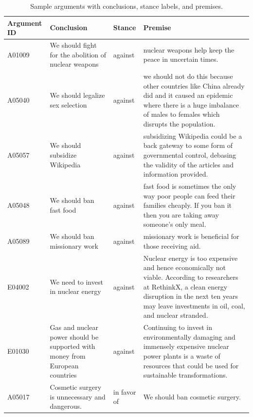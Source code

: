 \begin{table}[htbp]
\centering
\begingroup
\footnotesize
\renewcommand{\arraystretch}{1.12}%
\setlength{\tabcolsep}{4pt}%

\begin{tabularx}{\textwidth}{
  >{\raggedright\arraybackslash}p{1.8cm}   %
  >{\raggedright\arraybackslash}p{5.2cm}   %
  >{\raggedright\arraybackslash}p{1.6cm}   %
  >{\raggedright\arraybackslash}X          %
}
\toprule
\textbf{Argument ID} & \textbf{Conclusion} & \textbf{Stance} & \textbf{Premise} \\
\midrule
A01009 & We should fight for the abolition of nuclear weapons & against &
nuclear weapons help keep the peace in uncertain times. \\
A05040 & We should legalize sex selection & against &
we should not do this because other countries like China already did and it caused an epidemic where there is a huge imbalance of males to females which disrupts the population. \\
A05057 & We should subsidize Wikipedia & against &
subsidizing Wikipedia could be a back gateway to some form of governmental control, debasing the validity of the articles and information provided. \\
A05048 & We should ban fast food & against &
fast food is sometimes the only way poor people can feed their families cheaply. If you ban it then you are taking away someone's only meal. \\
A05089 & We should ban missionary work & against &
missionary work is beneficial for those receiving aid. \\
E04002 & We need to invest in nuclear energy & against &
Nuclear energy is too expensive and hence economically not viable. According to researchers at RethinkX, a clean energy disruption in the next ten years may leave investments in oil, coal, and nuclear stranded. \\
E01030 & Gas and nuclear power should be supported with money from European countries & against &
Continuing to invest in environmentally damaging and immensely expensive nuclear power plants is a waste of resources that could be used for sustainable transformations. \\
A05017 & Cosmetic surgery is unnecessary and dangerous. & in favor of &
We should ban cosmetic surgery. \\
\bottomrule
\end{tabularx}

\endgroup
\caption{Sample arguments with conclusions, stance labels, and premises.}
\label{tab:dataset_samples}
\end{table}



